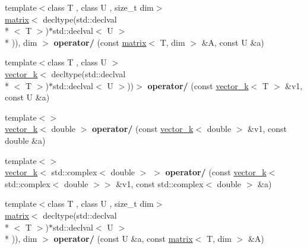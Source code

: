 \begin{DoxyCompactItemize}
\item 
\hypertarget{namespacekeycpp_a4bb5672c8d698032875766c42cd52547}{{\footnotesize template$<$class T , class U , size\-\_\-t dim$>$ }\\\hyperlink{classkeycpp_1_1matrix}{matrix}$<$ decltype(std\-::declval\\*
$<$ T $>$)$\ast$std\-::declval$<$ U $>$\\*
)), dim $>$ {\bfseries operator/} (const \hyperlink{classkeycpp_1_1matrix}{matrix}$<$ T, dim $>$ \&A, const U \&a)}\label{namespacekeycpp_a4bb5672c8d698032875766c42cd52547}

\item 
\hypertarget{namespacekeycpp_afce3d5f6cf95bb68e12f3f80ff146ed8}{{\footnotesize template$<$class T , class U $>$ }\\\hyperlink{classkeycpp_1_1vector__k}{vector\-\_\-k}$<$ decltype(std\-::declval\\*
$<$ T $>$)$\ast$std\-::declval$<$ U $>$))$>$ {\bfseries operator/} (const \hyperlink{classkeycpp_1_1vector__k}{vector\-\_\-k}$<$ T $>$ \&v1, const U \&a)}\label{namespacekeycpp_afce3d5f6cf95bb68e12f3f80ff146ed8}

\item 
\hypertarget{namespacekeycpp_acf439f423c568a970ddc8cde5940a0e8}{{\footnotesize template$<$$>$ }\\\hyperlink{classkeycpp_1_1vector__k}{vector\-\_\-k}$<$ double $>$ {\bfseries operator/} (const \hyperlink{classkeycpp_1_1vector__k}{vector\-\_\-k}$<$ double $>$ \&v1, const double \&a)}\label{namespacekeycpp_acf439f423c568a970ddc8cde5940a0e8}

\item 
\hypertarget{namespacekeycpp_aef7e4ab9c187ffa93e45ec90e2d1d5d4}{{\footnotesize template$<$$>$ }\\\hyperlink{classkeycpp_1_1vector__k}{vector\-\_\-k}$<$ std\-::complex$<$ double $>$ $>$ {\bfseries operator/} (const \hyperlink{classkeycpp_1_1vector__k}{vector\-\_\-k}$<$ std\-::complex$<$ double $>$$>$ \&v1, const std\-::complex$<$ double $>$ \&a)}\label{namespacekeycpp_aef7e4ab9c187ffa93e45ec90e2d1d5d4}

\item 
\hypertarget{namespacekeycpp_a88f5fa68e3f7fb39690f9e5c93bafc5c}{{\footnotesize template$<$class T , class U , size\-\_\-t dim$>$ }\\\hyperlink{classkeycpp_1_1matrix}{matrix}$<$ decltype(std\-::declval\\*
$<$ T $>$)$\ast$std\-::declval$<$ U $>$\\*
)), dim $>$ {\bfseries operator/} (const U \&a, const \hyperlink{classkeycpp_1_1matrix}{matrix}$<$ T, dim $>$ \&A)}\label{namespacekeycpp_a88f5fa68e3f7fb39690f9e5c93bafc5c}


\end{DoxyCompactItemize}
